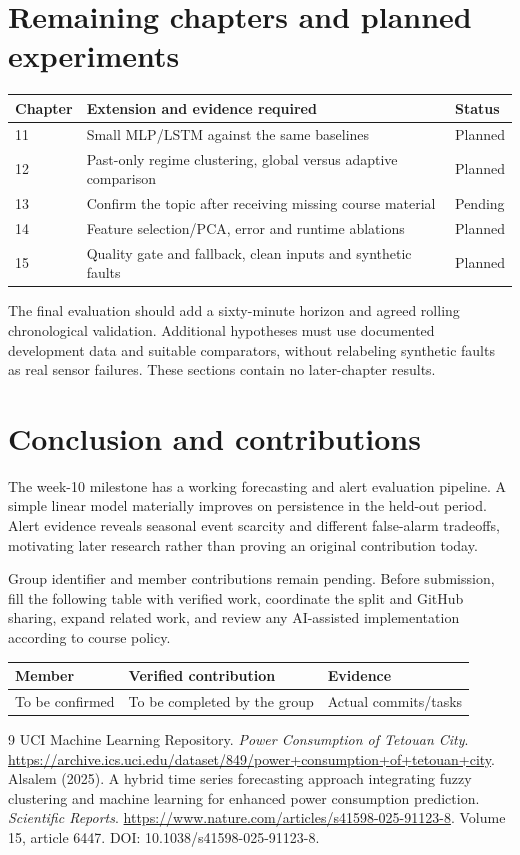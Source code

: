 \documentclass[11pt,a4paper]{article}
\begin{document}
\section{Remaining chapters and planned experiments}
\begin{center}\small
\begin{tabularx}{\linewidth}{lXl}\toprule
Chapter & Extension and evidence required & Status\\\midrule
11 & Small MLP/LSTM against the same baselines & Planned\\
12 & Past-only regime clustering, global versus adaptive comparison & Planned\\
13 & Confirm the topic after receiving missing course material & Pending\\
14 & Feature selection/PCA, error and runtime ablations & Planned\\
15 & Quality gate and fallback, clean inputs and synthetic faults & Planned\\\bottomrule
\end{tabularx}\end{center}
The final evaluation should add a sixty-minute horizon and agreed rolling chronological validation. Additional hypotheses must use documented development data and suitable comparators, without relabeling synthetic faults as real sensor failures. These sections contain no later-chapter results.

\section{Conclusion and contributions}
The week-10 milestone has a working forecasting and alert evaluation pipeline. A simple linear model materially improves on persistence in the held-out period. Alert evidence reveals seasonal event scarcity and different false-alarm tradeoffs, motivating later research rather than proving an original contribution today.

Group identifier and member contributions remain pending. Before submission, fill the following table with verified work, coordinate the split and GitHub sharing, expand related work, and review any AI-assisted implementation according to course policy.
\begin{center}
\begin{tabularx}{\linewidth}{lXX}\toprule
Member & Verified contribution & Evidence\\\midrule
To be confirmed & To be completed by the group & Actual commits/tasks\\\bottomrule
\end{tabularx}\end{center}

\begin{thebibliography}{9}
 UCI Machine Learning Repository. \emph{Power Consumption of Tetouan City}. \url{https://archive.ics.uci.edu/dataset/849/power+consumption+of+tetouan+city}.
 Alsalem (2025). A hybrid time series forecasting approach integrating fuzzy clustering and machine learning for enhanced power consumption prediction. \emph{Scientific Reports}. \url{https://www.nature.com/articles/s41598-025-91123-8}. Volume 15, article 6447. DOI: 10.1038/s41598-025-91123-8.
\end{thebibliography}
\end{document}
